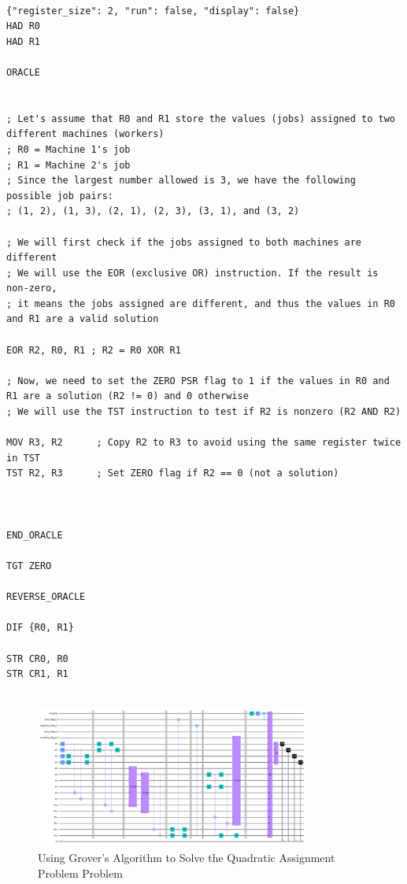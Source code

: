 \begin{lstlisting}

{"register_size": 2, "run": false, "display": false}
HAD R0
HAD R1

ORACLE


; Let's assume that R0 and R1 store the values (jobs) assigned to two different machines (workers)
; R0 = Machine 1's job
; R1 = Machine 2's job
; Since the largest number allowed is 3, we have the following possible job pairs:
; (1, 2), (1, 3), (2, 1), (2, 3), (3, 1), and (3, 2)

; We will first check if the jobs assigned to both machines are different
; We will use the EOR (exclusive OR) instruction. If the result is non-zero, 
; it means the jobs assigned are different, and thus the values in R0 and R1 are a valid solution

EOR R2, R0, R1 ; R2 = R0 XOR R1

; Now, we need to set the ZERO PSR flag to 1 if the values in R0 and R1 are a solution (R2 != 0) and 0 otherwise
; We will use the TST instruction to test if R2 is nonzero (R2 AND R2)

MOV R3, R2      ; Copy R2 to R3 to avoid using the same register twice in TST
TST R2, R3      ; Set ZERO flag if R2 == 0 (not a solution)



END_ORACLE

TGT ZERO

REVERSE_ORACLE

DIF {R0, R1}

STR CR0, R0
STR CR1, R1


\end{lstlisting}

\begin{figure}[htp]
    \centering
    \includegraphics[width=9cm]{Figures/Quadratic_Assignment_Problem_circuit.png}
    \caption{Using Grover's Algorithm to Solve the Quadratic Assignment Problem Problem}
    \label{fig:Quadratic_Assignment_Problem}
\end{figure}

